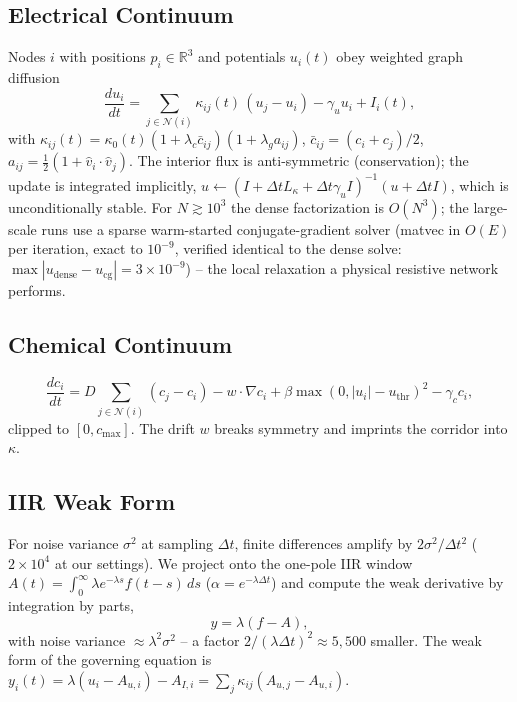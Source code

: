 \documentclass[conference]{IEEEtran}
\begin{document}
\subsection{Electrical Continuum}
Nodes $i$ with positions $p_i \in \mathbb{R}^3$ and potentials $u_i(t)$ obey weighted
graph diffusion
\begin{equation}
\frac{du_i}{dt} = \sum_{j \in \mathcal{N}(i)} \kappa_{ij}(t)\,(u_j - u_i)
- \gamma_u u_i + I_i(t),
\end{equation}
with $\kappa_{ij}(t) = \kappa_0(t)(1 + \lambda_c \bar c_{ij})(1 + \lambda_g a_{ij})$,
$\bar c_{ij} = (c_i + c_j)/2$, $a_{ij} = \tfrac{1}{2}(1 + \hat v_i \cdot \hat v_j)$.
The interior flux is anti-symmetric (conservation); the update is integrated
implicitly, $u \leftarrow (I + \Delta t L_\kappa + \Delta t \gamma_u I)^{-1}(u +
\Delta t I)$, which is unconditionally stable. For $N \gtrsim 10^3$ the dense
factorization is $O(N^3)$; the large-scale runs use a sparse warm-started
conjugate-gradient solver (matvec in $O(E)$ per iteration, exact to $10^{-9}$,
verified identical to the dense solve: $\max|u_{\mathrm{dense}} - u_{\mathrm{cg}}| =
3{\times}10^{-9}$) -- the local relaxation a physical resistive network performs.

\subsection{Chemical Continuum}
\begin{equation}
\frac{dc_i}{dt} = D \sum_{j \in \mathcal{N}(i)}(c_j - c_i) - w \cdot \nabla c_i
+ \beta \max(0, |u_i| - u_{\mathrm{thr}})^2 - \gamma_c c_i,
\end{equation}
clipped to $[0, c_{\max}]$. The drift $w$ breaks symmetry and imprints the corridor
into $\kappa$.

\subsection{IIR Weak Form}
For noise variance $\sigma^2$ at sampling $\Delta t$, finite differences amplify by
$2\sigma^2/\Delta t^2$ ($2\times10^4$ at our settings). We project onto the one-pole
IIR window $A(t) = \int_0^\infty \lambda e^{-\lambda s} f(t-s)\,ds$ ($\alpha =
e^{-\lambda\Delta t}$) and compute the weak derivative by integration by parts,
\begin{equation}
y = \lambda(f - A),
\end{equation}
with noise variance $\approx \lambda^2\sigma^2$ -- a factor
$2/(\lambda\Delta t)^2 \approx 5{,}500$ smaller. The weak form of the governing
equation is $y_i(t) = \lambda(u_i - A_{u,i}) - A_{I,i} = \sum_j \kappa_{ij}(A_{u,j} -
A_{u,i})$.
\end{document}
